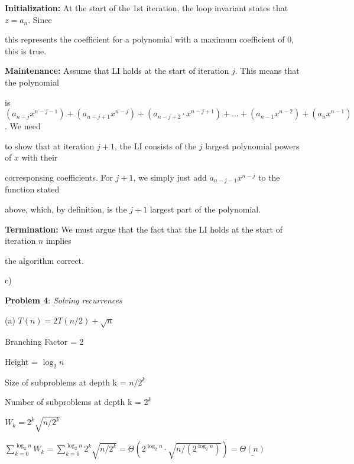 \documentclass{article} %
\newcommand{\question}[2][]{\begin{flushleft}
        \textbf{Problem #1}: \textit{#2}

\end{flushleft}}
\begin{document}
    \textbf{Initialization:} At the start of the 1st iteration, the loop invariant states that $z = a_n$. Since 
    
    this represents the coefficient for a polynomial with a maximum coefficient of 0, this is true.

    \vspace{5pt}

    \textbf{Maintenance:} Assume that LI holds at the start of iteration $j$. This means that the polynomial 
    
    is $(a_{n - j} x^{n - j - 1}) + (a_{n - j + 1} x ^ {n - j}) + (a_{n - j + 2} \cdot x^{n - j + 1}) + ... + (a_{n - 1}x^{n - 2}) + (a_nx^{n - 1})$. We need 
    
    to show that at iteration $j + 1$, the LI consists of the $j$ largest polynomial powers of $x$ with their 
    
    corresponsing coefficients. For $j + 1$, we simply just add $a_{n - j - 1} x^{n-j}$ to the function stated 
    
    above, which, by definition, is the $j + 1$ largest part of the polynomial.

    \vspace{5pt}

    \textbf{Termination:} We must argue that the fact that the LI holds at the start of iteration $n$ implies
    
    the algorithm correct. 

    c) 

    \newpage

    \question[4]{Solving recurrences}

    (a) $T(n) = 2T(n / 2) + \sqrt{n}$
    
    \hspace{13pt} Branching Factor = 2
    
    \hspace{13pt} Height = $\log_2n $

    \hspace{13pt} Size of subproblems at depth k = $n/2^k$

    \hspace{13pt} Number of subproblems at depth k = $2^k$

    \hspace{13pt} $W_k = 2^k \sqrt{n/2^k}$

    \hspace{13pt} $\sum^{\log_2 n}_{k = 0} W_k = \sum^{\log_2 n}_{k = 0} 2^k \sqrt{n/2^k} = \Theta(2^{\log_2n} \cdot \sqrt{n/(2^{\log_2n})}) = \underline{\Theta(n)}$
\end{document}
